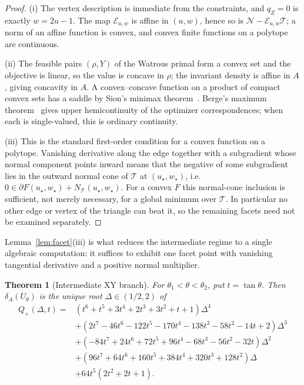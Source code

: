 \documentclass[11pt,a4paper]{article}
\newtheorem{theorem}{Theorem}
\theoremstyle{remark}
\newcommand{\cE}{\mathcal{E}}
\newcommand{\cN}{\mathcal{N}}
\newcommand{\cT}{\mathcal{T}}
\begin{document}
\begin{proof}
(i) The vertex description is immediate from the constraints, and $q_Z=0$ is
exactly $w=2u-1$.  The map $\cE_{u,w}$ is affine in $(u,w)$, hence so is
$\cN-\cE_{u,w}\cT$; a norm of an affine function is convex, and convex finite
functions on a polytope are continuous.

(ii) The feasible pairs $(\rho,Y)$ of the Watrous primal form a convex set
and the objective is linear, so the value is concave in $\rho$; the invariant
density is affine in $A$, giving concavity in $A$.  A convex--concave
function on a product of compact convex sets has a saddle by Sion's minimax
theorem~\cite{sion1958}.  Berge's maximum theorem~\cite{berge1963} gives
upper hemicontinuity of the optimizer correspondences; when each is
single-valued, this is ordinary continuity.

(iii) This is the standard first-order condition for a convex function on a
polytope.  Vanishing derivative along the edge together with a subgradient
whose normal component points inward means that the negative of some
subgradient lies in the outward normal cone of $\mathcal T$ at
$(u_\star,w_\star)$, i.e.\
$0\in\partial F(u_\star,w_\star)+N_{\mathcal T}(u_\star,w_\star)$.  For a
convex $F$ this normal-cone inclusion is sufficient, not merely necessary,
for a global minimum over $\mathcal T$.  In particular no other edge or
vertex of the triangle can beat it, so the remaining facets need not be
examined separately.
\end{proof}

Lemma~\ref{lem:facet}(iii) is what reduces the intermediate regime to a
single algebraic computation: it suffices to exhibit one facet point with
vanishing tangential derivative and a positive normal multiplier.

\begin{theorem}[Intermediate XY branch]
\label{thm:xy-middle}
For $\theta_1<\theta<\theta_2$, put $t=\tan\theta$.  Then
$\delta_A(U_\theta)$ is the unique root $\Delta\in(1/2,2)$ of
\begin{align}
 Q_+(\Delta,t)={}&
 (t^6+t^5+3t^4+2t^3+3t^2+t+1)\Delta^4\nonumber\\
 &+(2t^7-46t^6-122t^5-170t^4-138t^3-58t^2-14t+2)\Delta^3\nonumber\\
 &+(-84t^7+24t^6+72t^5+96t^4-68t^3-56t^2-32t)\Delta^2\nonumber\\
 &+(96t^7+64t^6+160t^5+384t^4+320t^3+128t^2)\Delta\nonumber\\
 &+64t^5(2t^2+2t+1).
 \label{eq:xy-middle-quartic}
\end{align}
\end{theorem}
\end{document}
